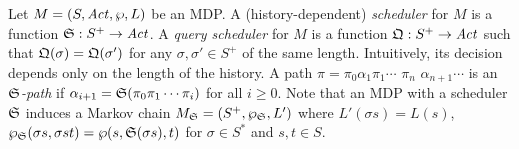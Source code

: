 Let $M = (S, \mathit{Act}, \wp, L)$ be an MDP. A (history-dependent)
\emph{scheduler} for $M$ is a function $\mathfrak{S} : S^+
\rightarrow \mathit{Act}$. A \emph{query scheduler} for $M$ is a function
$\mathfrak{Q} : S^+ \rightarrow \mathit{Act}$ such that
$\mathfrak{Q}(\sigma) = \mathfrak{Q}(\sigma')$ for any $\sigma,
\sigma' \in S^+$ of the same length.
Intuitively, its decision depends only on the length of the history.
A path $\pi =
\pi_0 \alpha_1 \pi_1 \cdots$ $\pi_n$ $\alpha_{n+1} \cdots$ is an
\emph{$\mathfrak{S}$-path} if $\alpha_{i+1} = \mathfrak{S}(\pi_0
\pi_1 \cdots \pi_i)$ for all $i \geq 0$.
Note that an MDP with a
scheduler $\mathfrak{S}$ induces a Markov chain $M_{\mathfrak{S}} =
(S^+, \wp_{\mathfrak{S}}, L')$ where $L' (\sigma s) = L (s)$,
$\wp_{\mathfrak{S}} (\sigma s, \sigma s t) = \wp (s,
\mathfrak{S}(\sigma s), t)$ for $\sigma \in S^*$ and $s, t \in S$.

